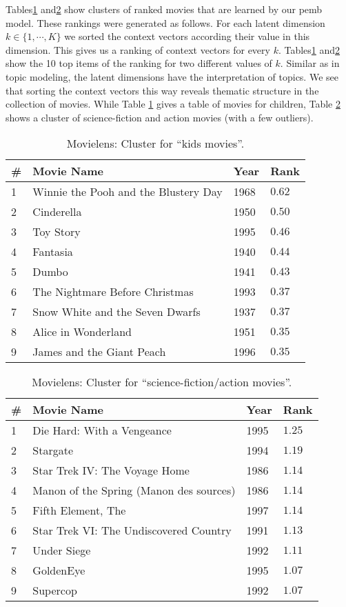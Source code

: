 \documentclass[12pt]{article}
\begin{document}
Tables\nobreakspace \ref {tab:kids_movies} and\nobreakspace  \ref {tab:scifi_movies} show clusters of ranked movies that are learned by our \gls{pemb} model.
These rankings were generated as follows. For each latent dimension $k\in\{1,\cdots,K\}$ we sorted the context vectors according their value in this dimension.
This gives us a ranking of context vectors for every $k$. 
Tables\nobreakspace \ref {tab:kids_movies} and\nobreakspace  \ref {tab:scifi_movies} show the 10 top items of the ranking for two different values of $k$. Similar as in topic modeling, the latent dimensions have the interpretation of topics. We see that sorting the context vectors this way reveals thematic structure in the collection of movies. While Table \ref{tab:kids_movies} gives a table of movies for children, Table \ref{tab:scifi_movies} shows a cluster of science-fiction and action movies (with a few outliers). 
\begin{table}[h]
\centering
\begin{tabular}{llll}\toprule
	\# & Movie Name                         & Year &  Rank       \\ \hline
1 & Winnie the Pooh and the Blustery Day & 1968 & $0.62$ \\
2 & Cinderella & 1950 & $0.50$ \\
3 & Toy Story & 1995 & $0.46$ \\
4 & Fantasia & 1940 & $0.44$ \\
5 & Dumbo & 1941 & $0.43$ \\
6 & The Nightmare Before Christmas & 1993 & $0.37$ \\
7 & Snow White and the Seven Dwarfs & 1937 & $0.37$ \\
8 & Alice in Wonderland & 1951 & $0.35$ \\
9 & James and the Giant Peach & 1996 & $0.35$ \\ \bottomrule
\end{tabular}
\caption{\label{tab:kids_movies} Movielens: Cluster for ``kids movies''.}
\end{table}

\begin{table}[h]
\centering
\begin{tabular}{llll}\toprule
\# & Movie Name                         & Year &  Rank       \\ \hline
1 & Die Hard: With a Vengeance & 1995 & $1.25$ \\
2 & Stargate & 1994 & $1.19$ \\
3 & Star Trek IV: The Voyage Home & 1986 & $1.14$ \\
4 & Manon of the Spring (Manon des sources) & 1986 & $1.14$ \\
5 & Fifth Element, The & 1997 & $1.14$ \\
6 & Star Trek VI: The Undiscovered Country & 1991 & $1.13$ \\
7 & Under Siege & 1992 & $1.11$ \\
8 & GoldenEye & 1995 & $1.07$ \\
9 & Supercop & 1992 & $1.07$ \\ \bottomrule
\end{tabular}
\caption{\label{tab:scifi_movies} Movielens: Cluster for ``science-fiction/action movies''.}
\end{table}
\end{document}
